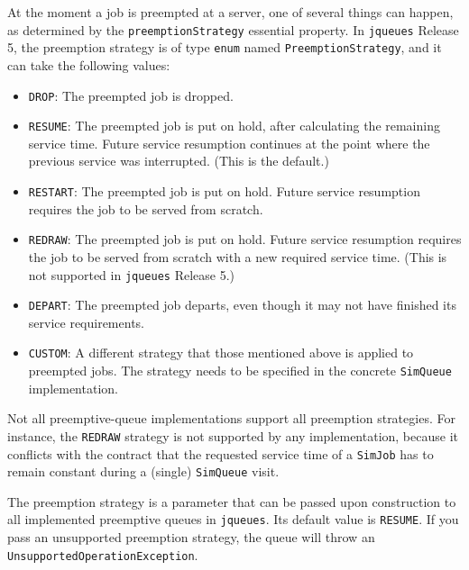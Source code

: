 At the moment a job is preempted at a server,
  one of several things can happen,
  as determined by the \lstinline|preemptionStrategy|
  essential property.
In \lstinline|jqueues| Release 5,
  the preemption strategy is of type \lstinline|enum|
  named \lstinline|PreemptionStrategy|,
  and it can take the following values:
\begin{itemize}
  \item \lstinline|DROP|: The preempted job is dropped.
  \item \lstinline|RESUME|: The preempted job is put on hold,
                              after calculating the remaining service time.
                            Future service resumption continues
                              at the point where the previous service
                              was interrupted.
                            (This is the default.) 
  \item \lstinline|RESTART|: The preempted job is put on hold.
                             Future service resumption
                               requires the job to be served from scratch.
  \item \lstinline|REDRAW|: The preempted job is put on hold.
                            Future service resumption
                              requires the job to be served from scratch
                              with a new required service time.
                            (This is not supported in \lstinline|jqueues| Release 5.)
  \item \lstinline|DEPART|: The preempted job departs,
                              even though it may not have finished
                              its service requirements.
  \item \lstinline|CUSTOM|: A different strategy that those mentioned
                              above is applied to preempted jobs.
                            The strategy needs to be specified
                            in the concrete \lstinline|SimQueue| implementation.
\end{itemize}
Not all preemptive-queue implementations
  support all preemption strategies.
For instance, the \lstinline|REDRAW| strategy
  is not supported by any implementation,
  because it conflicts with the contract
  that the requested service time of a \lstinline|SimJob|
  has to remain constant
  during a (single) \lstinline|SimQueue| visit.

The preemption strategy
  is a parameter that can be passed upon construction
  to all implemented preemptive queues
  in \lstinline|jqueues|.
Its default value is \lstinline|RESUME|.
If you pass an unsupported preemption strategy,
  the queue will throw an \lstinline|UnsupportedOperationException|.

